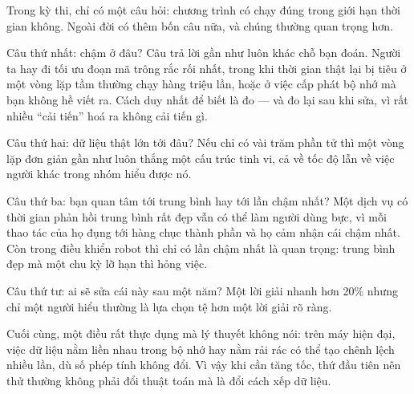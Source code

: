\documentclass[../../algorithm.tex]{subfiles}
\begin{document}
\begin{dongian}
Trong kỳ thi, chỉ có một câu hỏi: chương trình có chạy đúng trong giới hạn thời gian không. Ngoài đời có thêm bốn câu nữa, và chúng thường quan trọng hơn.

Câu thứ nhất: chậm ở đâu? Câu trả lời gần như luôn khác chỗ bạn đoán. Người ta hay đi tối ưu đoạn mã trông rắc rối nhất, trong khi thời gian thật lại bị tiêu ở một vòng lặp tầm thường chạy hàng triệu lần, hoặc ở việc cấp phát bộ nhớ mà bạn không hề viết ra. Cách duy nhất để biết là đo --- và đo lại sau khi sửa, vì rất nhiều ``cải tiến'' hoá ra không cải tiến gì.

Câu thứ hai: dữ liệu thật lớn tới đâu? Nếu chỉ có vài trăm phần tử thì một vòng lặp đơn giản gần như luôn thắng một cấu trúc tinh vi, cả về tốc độ lẫn về việc người khác trong nhóm hiểu được nó.

Câu thứ ba: bạn quan tâm tới trung bình hay tới lần chậm nhất? Một dịch vụ có thời gian phản hồi trung bình rất đẹp vẫn có thể làm người dùng bực, vì mỗi thao tác của họ đụng tới hàng chục thành phần và họ cảm nhận cái chậm nhất. Còn trong điều khiển robot thì chỉ có lần chậm nhất là quan trọng: trung bình đẹp mà một chu kỳ lỡ hạn thì hỏng việc.

Câu thứ tư: ai sẽ sửa cái này sau một năm? Một lời giải nhanh hơn 20\% nhưng chỉ một người hiểu thường là lựa chọn tệ hơn một lời giải rõ ràng.

Cuối cùng, một điều rất thực dụng mà lý thuyết không nói: trên máy hiện đại, việc dữ liệu nằm liền nhau trong bộ nhớ hay nằm rải rác có thể tạo chênh lệch nhiều lần, dù số phép tính không đổi. Vì vậy khi cần tăng tốc, thứ đầu tiên nên thử thường không phải đổi thuật toán mà là đổi cách xếp dữ liệu.
\end{dongian}
\end{document}
